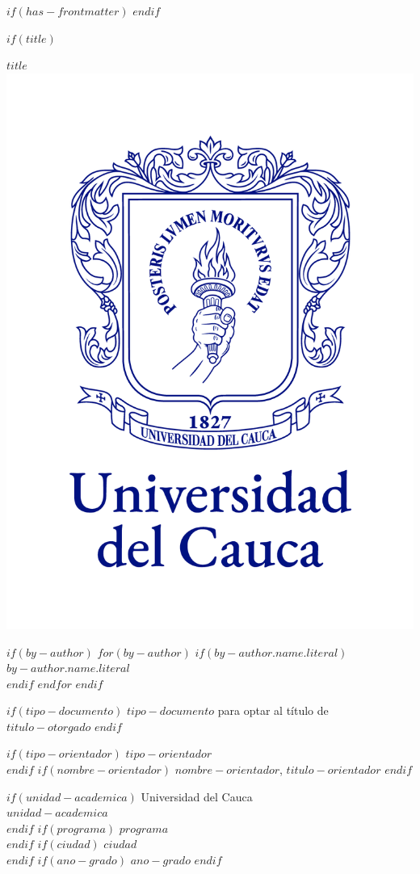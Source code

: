 $if(has-frontmatter)$
\frontmatter
$endif$

$if(title)$
\cleardoublepage
\thispagestyle{empty}

{\centering
{\bfseries $title$}\\[2cm]
\includegraphics{assets/unicauca_vertical.png}
\vspace{1cm}

\vspace{1cm}
$if(by-author)$
$for(by-author)$
$if(by-author.name.literal)$
{$by-author.name.literal$}\\
$endif$
$endfor$
$endif$

\vspace{2cm}
$if(tipo-documento)$
{$tipo-documento$ para optar al título de $titulo-otorgado$}
$endif$

\vspace{2cm}
$if(tipo-orientador)$
{$tipo-orientador$}\\
$endif$
$if(nombre-orientador)$
{$nombre-orientador$, $titulo-orientador$}
$endif$

\vspace{2cm}
$if(unidad-academica)$
{Universidad del Cauca}\\
{$unidad-academica$}\\
$endif$
$if(programa)$
{$programa$}\\
$endif$
$if(ciudad)$
{$ciudad$}\\
$endif$
$if(ano-grado)$
{$ano-grado$}
$endif$

}

